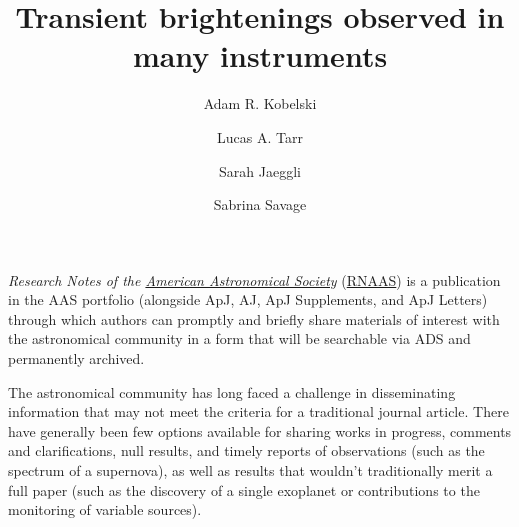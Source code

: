 \documentclass[RNAAS]{aastex62}
\begin{document}
\title{Transient brightenings observed in many instruments}


\author{Adam R. Kobelski}

\author{Lucas A. Tarr}

\author{Sarah Jaeggli}

\author{Sabrina Savage}



\section{} 

\textit{Research Notes of the \href{https://aas.org}{American Astronomical Society}}
(\href{http://rnaas.aas.org}{RNAAS}) is a publication in the AAS portfolio
(alongside ApJ, AJ, ApJ Supplements, and ApJ Letters) through which authors can 
promptly and briefly share materials of interest with the astronomical community
in a form that will be searchable via ADS and permanently archived.

The astronomical community has long faced a challenge in disseminating
information that may not meet the criteria for a traditional journal article.
There have generally been few options available for sharing works in progress,
comments and clarifications, null results, and timely reports of observations
(such as the spectrum of a supernova), as well as results that wouldn’t
traditionally merit a full paper (such as the discovery of a single exoplanet
or contributions to the monitoring of variable sources). 
\end{document}
